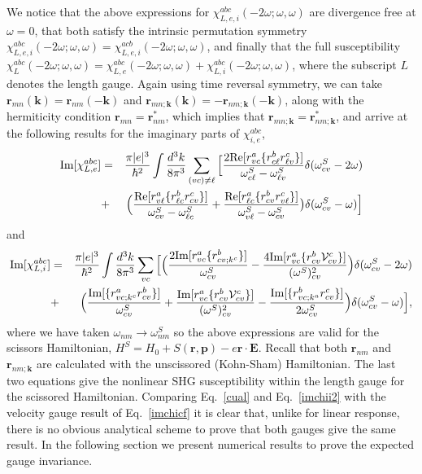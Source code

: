 \documentclass[floatfix,prb,aps,superscriptaddress,11pt]{revtex4}
\begin{document}
We notice that the above expressions for $\chi _{L,e,i}^{abc}(-2\omega;\omega,\omega)$ are
divergence free at $\omega=0$, that both satisfy the intrinsic permutation
symmetry $\chi _{L,e,i}^{abc}(-2\omega;\omega,\omega)=\chi _{L,e,i}^{acb}(-2\omega;\omega,\omega)$, and finally that the
full susceptibility 
$\chi _{L}^{abc}(-2\omega;\omega,\omega)=\chi _{L,e}^{abc}(-2\omega;\omega,\omega)+\chi _{L,i}^{abc}(-2\omega;\omega,\omega)$,
where the subscript $L$ denotes the length gauge. Again using time reversal
symmetry, we can take $\mathbf{r}_{mn}(\mathbf{k})=\mathbf{r}_{nm}(-\mathbf{k})$ and $\mathbf{r}_{mn;\mathbf{k}}(
\mathbf{k})=-\mathbf{r}_{nm;\mathbf{k}}(-\mathbf{k})$, along with the hermiticity condition $\mathbf{r}%
_{mn}=\mathbf{r}_{nm}^{\ast }$, which implies that $\mathbf{r}_{mn;\mathbf{k}}=\mathbf{r}_{nm;\mathbf{k}%
}^{\ast }$, and arrive at the following results for the imaginary parts of $
\chi _{i,e}^{abc}$, 
\begin{eqnarray}
\mbox{Im}\lbrack \chi _{L,e}^{abc}] &=&\frac{\pi |e|^{3}}{\hbar ^{2}}\int 
\frac{d^{3}k}{8\pi ^{3}}\sum_{(vc)\neq \ell }\Big[\frac{2\mbox{Re}\lbrack
r_{vc}^{a}\{r_{c\ell }^{b}r_{\ell v}^{c}\}]}{\omega_{c\ell }^{S}-\omega_{\ell
v}^{S}}\delta(\omega_{cv}^{S}-2\omega)  \notag  \label{cual} \\
&+&\Big(\frac{\mbox{Re}\lbrack r_{v\ell }^{a}\{r_{\ell c}^{b}r_{cv}^{c}\}]}{
\omega_{cv}^{S}-\omega_{\ell c}^{S}}+\frac{\mbox{Re}\lbrack r_{\ell
c}^{a}\{r_{cv}^{b}r_{v\ell }^{c}\}]}{\omega_{v\ell }^{S}-\omega_{cv}^{S}}\big)\delta(
\omega_{cv}^{S}-\omega)\Big]
\end{eqnarray}
and 
\begin{eqnarray}
\mbox{Im}\lbrack \chi _{L,i}^{abc}] &=&\frac{\pi |e|^{3}}{\hbar ^{2}}\int 
\frac{d^{3}k}{8\pi ^{3}}\sum_{vc}\Big[\Big(\frac{2\mbox{Im}\lbrack
r_{vc}^{a}\{r_{cv;k^{c}}^{b}\}]}{\omega_{cv}^{S}}-\frac{4\mbox{Im}\lbrack
r_{vc}^{a}\{r_{cv}^{b}{\cal V}_{cv}^{c}\}]}{(\omega^{S})_{cv}^{2}}\Big)\delta(\omega
_{cv}^{S}-2\omega)  \notag  \label{imchii2} \\
&+&\Big(\frac{\mbox{Im}\lbrack \{r_{vc;k^{c}}^{a}r_{cv}^{b}\}]}{\omega_{cv}^{S}}
+\frac{\mbox{Im}\lbrack r_{vc}^{a}\{r_{cv}^{b}{\cal V}_{cv}^{c}\}]}{(\omega
^{S})_{cv}^{2}}-\frac{\mbox{Im}\lbrack \{r_{vc;k^{a}}^{b}r_{cv}^{c}\}]}{2\omega
_{cv}^{S}}\Big)\delta(\omega_{cv}^{S}-\omega)\Big],
\end{eqnarray}
where we have taken $\omega_{nm}\rightarrow \omega_{nm}^{S}$ so the above
expressions are valid for the scissors Hamiltonian, $H^{S}=H_{0}+S(\mathbf{r},\mathbf{p}
)-e\mathbf{r}\cdot \mathbf{E}$. Recall that both $\mathbf{r}_{nm}$ and $\mathbf{r}_{nm;\mathbf{k}}$ are
calculated with the unscissored (Kohn-Sham) Hamiltonian.\cite{nastosPRB05}
The last two equations give the nonlinear SHG susceptibility within the
length gauge for the scissored Hamiltonian. 
Comparing
Eq.~\eqref{cual} and Eq.~\eqref{imchii2} with the velocity gauge result of
Eq.~\eqref{imchicf} it is clear that, unlike for linear response, there is
no obvious analytical scheme to prove that both gauges give the same result.
In the following section we present numerical results to prove the expected
gauge invariance.
\end{document}
